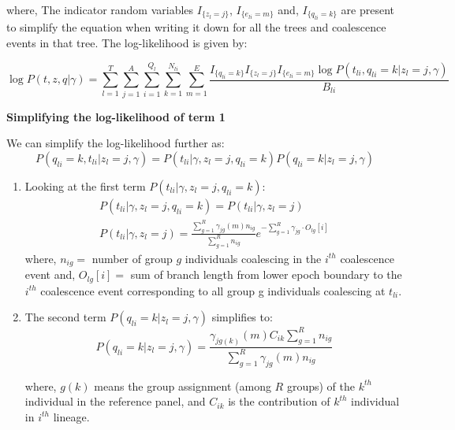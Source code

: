 where, The indicator random variables $I_{\{z_l = j\}}$, $I_{\{e_{l i} = m\}}$ and, $I_{\{q_{l i} = k\}}$ are present to simplify the equation when writing it down for all the trees and coalescence events in that tree. The log-likelihood is given by:

\begin{equation}
     \log P(t, z, q \vert \gamma) = \sum_{l = 1}^T \sum_{j = 1}^A \sum_{i = 1}^{Q_l} \sum_{k =1}^{N_{li}} \sum_{m = 1}^E  \frac{I_{\{q_{l i} = k\}} I_{\{z_l = j\}} I_{\{e_{l i} = m\}} \log P(t_{li}, q_{l i} = k \vert z_l = j, \gamma)}{B_{li}} 
\end{equation}

\textbf{Simplifying the log-likelihood of term 1}

We can simplify the log-likelihood further as:
\begin{equation}
    P(q_{li} = k, t_{li} | z_l = j, \gamma ) = P(t_{li} | \gamma, z_l = j, q_{li} = k)P(q_{li} = k | z_l = j, \gamma)
\end{equation}

\begin{enumerate}
    \item Looking at the first term $P(t_{li} | \gamma, z_l = j, q_{li} = k)$:
\begin{align}
    P(t_{li} | \gamma, z_l = j, q_{li} = k) = P(t_{li} | \gamma, z_l = j) \nonumber \\
    P(t_{li} | \gamma, z_l = j) = \frac{\sum_{g=1}^R\gamma_{jg}(m)n_{ig}}{\sum_{g=1}^R n_{ig}}e^{-\sum_{g=1}^R \gamma_{jg} \cdot O_{lg}[i]}
\end{align}
where, $n_{ig} =$  number of group $g$ individuals coalescing in the $i^{th}$ coalescence event and, $O_{lg}[i] =$ sum of branch length from lower epoch boundary to the $i^{th}$ coalescence event corresponding to all group g individuals coalescing at $t_{li}$.
\vspace{3mm}
\item The second term $P(q_{li} = k | z_l = j, \gamma)$ simplifies to:
\begin{equation}
    P(q_{li} = k | z_l = j, \gamma) = \frac{\gamma_{jg(k)}(m)C_{ik}\sum_{g=1}^Rn_{ig}}{\sum_{g=1}^R \gamma_{jg}(m)n_{ig}}
\label{eq:qli}
\end{equation}

where, $g(k)$ means the group assignment (among $R$ groups) of the $k^{th}$ individual in the reference panel, and $C_{ik}$ is the contribution of $k^{th}$ individual in $i^{th}$ lineage. 
\end{enumerate}

